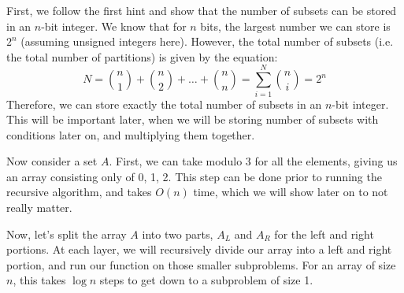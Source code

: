 \documentclass[11pt]{article}
\begin{document}
\begin{solution}
	First, we follow the first hint and show that the number of subsets can be stored in an $n$-bit integer. 
	We know that for $n$ bits, the largest number we can store is $2^n$ (assuming unsigned integers here). 
	However, the total number of subsets (i.e. the total number of partitions) is given by the equation:
	\[
		N = {n \choose 1} + {n \choose 2} + \dots + {n \choose n} = \sum_{i = 1}^N {n \choose i} = 2^n
	\] 
	Therefore, we can store exactly the total number of subsets in an $n$-bit integer. This will be important 
	later, when we will be storing number of subsets with conditions later on, and multiplying them together. 

	Now consider a set $A$. First, we can take modulo 3 for all the elements, giving us an array consisting
	only of 0, 1, 2. This step can be done prior to running the recursive algorithm, and takes $O(n)$ time, which
	we will show later on to not really matter. 
	 
	Now, let's split the array $A$ into two parts, $A_L$ and $A_R$ for the left and right portions. At each 
	layer, we will recursively divide our array into a left and right portion, and run our function on those
	smaller subproblems. For an array of size $n$, this takes $\log n$ steps to get down to a subproblem of size
	1. 


\end{solution}
\end{document}
